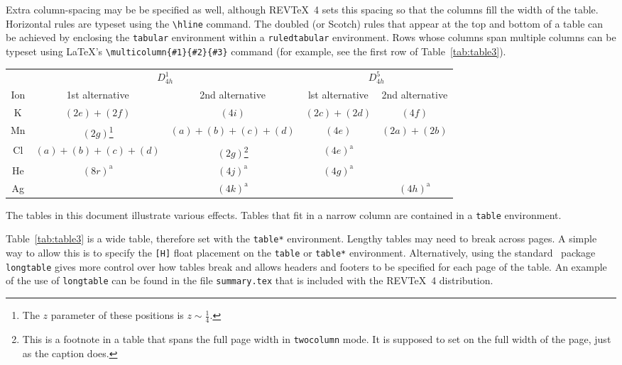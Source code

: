 \documentclass[%
 aapm,
 mph,%
 amsmath,amssymb,
 reprint,%
]{revtex4-2}
\begin{document}
Extra column-spacing may be be specified as well, although
REV\TeX~4 sets this spacing so that the columns fill the width of the
table.
Horizontal rules are typeset using the \verb+\hline+
command.
The doubled (or Scotch) rules that appear at the top and
bottom of a table can be achieved by enclosing the \texttt{tabular}
environment within a \texttt{ruledtabular} environment.
Rows whose columns span multiple columns can be typeset using \LaTeX's
\verb+\multicolumn{#1}{#2}{#3}+ command
(for example, see the first row of Table~\ref{tab:table3}).%
\begin{table*}
\caption{\label{tab:table3}This is a wide table that spans the page
width in \texttt{twocolumn} mode. It is formatted using the
\texttt{table*} environment. It also demonstrates the use of
\textbackslash\texttt{multicolumn} in rows with entries that span
more than one column.}
\begin{ruledtabular}
\begin{tabular}{ccccc}
 &\multicolumn{2}{c}{$D_{4h}^1$}&\multicolumn{2}{c}{$D_{4h}^5$}\\
 Ion&1st alternative&2nd alternative&lst alternative
&2nd alternative\\ \hline
 K&$(2e)+(2f)$&$(4i)$ &$(2c)+(2d)$&$(4f)$ \\
 Mn&$(2g)$\footnote{The $z$ parameter of these positions is $z\sim\frac{1}{4}$.}
 &$(a)+(b)+(c)+(d)$&$(4e)$&$(2a)+(2b)$\\
 Cl&$(a)+(b)+(c)+(d)$&$(2g)$\footnote{This is a footnote in a table that spans the full page
width in \texttt{twocolumn} mode. It is supposed to set on the full width of the page, just as the caption does. }
 &$(4e)^{\text{a}}$\\
 He&$(8r)^{\text{a}}$&$(4j)^{\text{a}}$&$(4g)^{\text{a}}$\\
 Ag& &$(4k)^{\text{a}}$& &$(4h)^{\text{a}}$\\
\end{tabular}
\end{ruledtabular}
\end{table*}

The tables in this document illustrate various effects.
Tables that fit in a narrow column are contained in a \texttt{table}
environment.

Table~\ref{tab:table3} is a wide table, therefore set with the
\texttt{table*} environment.
Lengthy tables may need to break across pages.
A simple way to allow this is to specify
the \verb+[H]+ float placement on the \texttt{table} or
\texttt{table*} environment.
Alternatively, using the standard \LaTeXe\ package \texttt{longtable} 
gives more control over how tables break and allows headers and footers 
to be specified for each page of the table.
An example of the use of \texttt{longtable} can be found
in the file \texttt{summary.tex} that is included with the REV\TeX~4
distribution.
\end{document}
